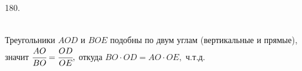 180. \begin{figure}[ht!]
\end{figure}\\
Треугольники $AOD$ и $BOE$ подобны по двум углам (вертикальные и прямые), значит $\cfrac{AO}{BO}=\cfrac{OD}{OE},$ откуда $BO\cdot OD=AO\cdot OE,$ ч.т.д.\\
